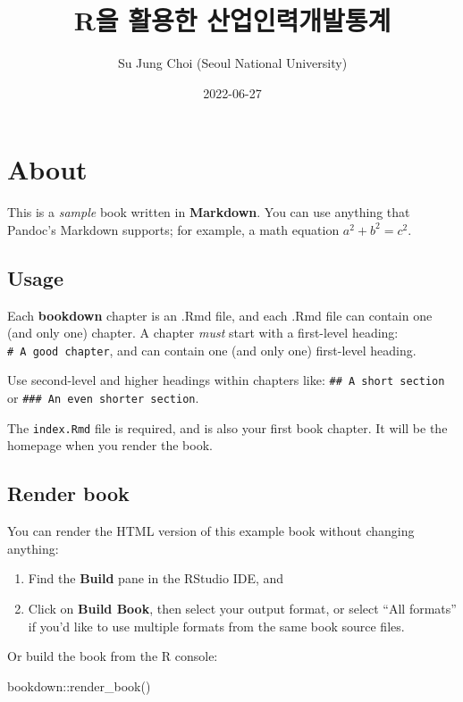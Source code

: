 \documentclass[
]{book}
\title{R을 활용한 산업인력개발통계}
\author{Su Jung Choi (Seoul National University)}
\date{2022-06-27}
\newenvironment{Shaded}{\begin{snugshade}}{\end{snugshade}}
\newcommand{\FunctionTok}[1]{\textcolor[rgb]{0.00,0.00,0.00}{#1}}
\newcommand{\NormalTok}[1]{#1}
\newcommand{\SpecialCharTok}[1]{\textcolor[rgb]{0.00,0.00,0.00}{#1}}
\theoremstyle{definition}
\theoremstyle{definition}
\theoremstyle{definition}
\theoremstyle{definition}
\theoremstyle{remark}
\begin{document}
\maketitle

{
\setcounter{tocdepth}{1}
\tableofcontents
}
\hypertarget{about}{%
\chapter{About}\label{about}}

This is a \emph{sample} book written in \textbf{Markdown}. You can use anything that Pandoc's Markdown supports; for example, a math equation \(a^2 + b^2 = c^2\).

\hypertarget{usage}{%
\section{Usage}\label{usage}}

Each \textbf{bookdown} chapter is an .Rmd file, and each .Rmd file can contain one (and only one) chapter. A chapter \emph{must} start with a first-level heading: \texttt{\#\ A\ good\ chapter}, and can contain one (and only one) first-level heading.

Use second-level and higher headings within chapters like: \texttt{\#\#\ A\ short\ section} or \texttt{\#\#\#\ An\ even\ shorter\ section}.

The \texttt{index.Rmd} file is required, and is also your first book chapter. It will be the homepage when you render the book.

\hypertarget{render-book}{%
\section{Render book}\label{render-book}}

You can render the HTML version of this example book without changing anything:

\begin{enumerate}
\def\labelenumi{\arabic{enumi}.}
\item
  Find the \textbf{Build} pane in the RStudio IDE, and
\item
  Click on \textbf{Build Book}, then select your output format, or select ``All formats'' if you'd like to use multiple formats from the same book source files.
\end{enumerate}

Or build the book from the R console:

\begin{Shaded}
\begin{Highlighting}[]
\NormalTok{bookdown}\SpecialCharTok{::}\FunctionTok{render\_book}\NormalTok{()}
\end{Highlighting}
\end{Shaded}
\end{document}
